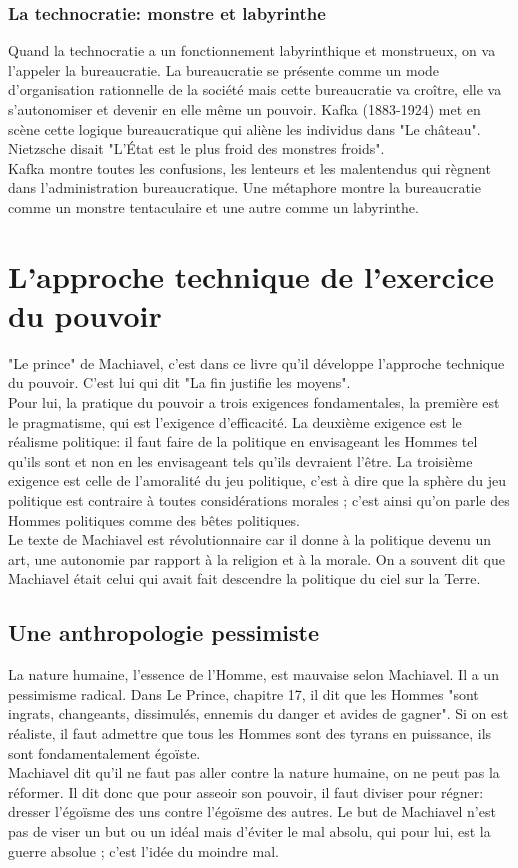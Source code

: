 \documentclass[10pt, a4paper, openany]{book}
\begin{document}
\subsubsection{La technocratie: monstre et labyrinthe}

Quand la technocratie a un fonctionnement labyrinthique et monstrueux, on va l'appeler la bureaucratie. La bureaucratie se présente comme un mode d'organisation rationnelle de la société mais cette bureaucratie va croître, elle va s'autonomiser et devenir en elle même un pouvoir. Kafka (1883-1924) met en scène cette logique bureaucratique qui aliène les individus dans "Le château". Nietzsche disait "L'État est le plus froid des monstres froids". \\
Kafka montre toutes les confusions, les lenteurs et les malentendus qui règnent dans l'administration bureaucratique. Une métaphore montre la bureaucratie comme un monstre tentaculaire et une autre comme un labyrinthe. 

\section{L'approche technique de l'exercice du pouvoir}

"Le prince" de Machiavel, c'est dans ce livre qu'il développe l'approche technique du pouvoir. C'est lui qui dit "La fin justifie les moyens". \\
Pour lui, la pratique du pouvoir a trois exigences fondamentales, la première est le pragmatisme, qui est l'exigence d'efficacité. La deuxième exigence est le réalisme politique: il faut faire de la politique en envisageant les Hommes tel qu'ils sont et non en les envisageant tels qu'ils devraient l'être. La troisième exigence est celle de l'amoralité du jeu politique, c'est à dire que la sphère du jeu politique est contraire à toutes considérations morales ; c'est ainsi qu'on parle des Hommes politiques comme des bêtes politiques. \\
Le texte de Machiavel est révolutionnaire car il donne à la politique devenu un art, une autonomie par rapport à la religion et à la morale. On a souvent dit que Machiavel était celui qui avait fait descendre la politique du ciel sur la Terre. 

\subsection{Une anthropologie pessimiste}

La nature humaine, l'essence de l'Homme, est mauvaise selon Machiavel. Il a un pessimisme radical. Dans Le Prince, chapitre 17, il dit que les Hommes "sont ingrats, changeants, dissimulés, ennemis du danger et avides de gagner". Si on est réaliste, il faut admettre que tous les Hommes sont des tyrans en puissance, ils sont fondamentalement égoïste. \\
Machiavel dit qu'il ne faut pas aller contre la nature humaine, on ne peut pas la réformer. Il dit  donc que pour asseoir son pouvoir, il faut diviser pour régner: dresser l'égoïsme des uns contre l'égoïsme des autres. Le but de Machiavel n'est pas de viser un but ou un idéal mais d'éviter le mal absolu, qui pour lui, est la guerre absolue ; c'est l'idée du moindre mal. 
\end{document}
